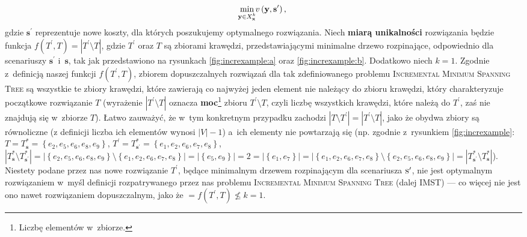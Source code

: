\begin{equation}
	\min_{\mathclap{\textbf{y} \in X^{k}_{\textbf{x}}}} v \left( \textbf{y}, \textbf{s}^{\prime} \right)\text{,}
\end{equation}\label{eq:imst}
gdzie $\textbf{s}^{\prime}$ reprezentuje nowe koszty, dla których poszukujemy optymalnego rozwiązania.
Niech \textbf{miarą unikalności} rozwiązania będzie funkcja $f \left( T^{\prime}, T \right) = \left| T^{\prime} \setminus T \right|$, gdzie $T^{\prime}$ oraz $T$ są zbiorami krawędzi, przedstawiającymi minimalne drzewo rozpinające, odpowiednio dla scenariuszy $\textbf{s}^{\prime}$ i~$\textbf{s}$, tak jak przedstawiono na rysunkach \ref{fig:increxample:a} oraz \ref{fig:increxample:b}.
Dodatkowo niech $k = 1$.
Zgodnie z~definicją naszej funkcji $f \left( T^{\prime}, T \right)$, zbiorem dopuszczalnych rozwiązań dla tak zdefiniowanego problemu \textsc{Incremental Minimum Spanning Tree} są wszystkie te zbiory krawędzi, które zawierają co najwyżej jeden element nie należący do zbioru krawędzi, który charakteryzuje początkowe rozwiązanie $T$ (wyrażenie $\left| T^{\prime} \setminus T \right|$ oznacza \textbf{moc}\footnote{
	Liczbę elementów w~zbiorze.
} zbioru $T^{\prime} \setminus T$, czyli liczbę wszystkich krawędzi, które należą do $T^{\prime}$, zaś nie znajdują się w~zbiorze $T$).
Łatwo zauważyć, że w~tym konkretnym przypadku zachodzi $\left| T \setminus T^{\prime} \right| = \left| T^{\prime} \setminus T \right|$, jako że obydwa zbiory są równoliczne (z definicji liczba ich elementów wynosi $\left| V \right| - 1$) a~ich elementy nie powtarzają się (np. zgodnie z~rysunkiem \ref{fig:increxample}: $T = T^{\ast}_{\textbf{s}} = \left\{ e_{2}, e_{5}, e_{6}, e_{8}, e_{9} \right\}$, $T^{\prime} = T^{\ast}_{\textbf{s}^{\prime}} = \left\{ e_{1}, e_{2}, e_{6}, e_{7}, e_{8} \right\}$, $\left| T^{\ast}_{\textbf{s}} \setminus T^{\ast}_{\textbf{s}^{\prime}} \right| = \left| \left\{ e_{2}, e_{5}, e_{6}, e_{8}, e_{9} \right\} \setminus \left\{ e_{1}, e_{2}, e_{6}, e_{7}, e_{8} \right\} \right| = \left| \left\{ e_{5}, e_{9} \right\} \right| = 2 = \left| \left\{ e_{1}, e_{7} \right\} \right| = \left| \left\{ e_{1}, e_{2}, e_{6}, e_{7}, e_{8} \right\} \setminus \left\{ e_{2}, e_{5}, e_{6}, e_{8}, e_{9} \right\} \right| = \left| T^{\ast}_{\textbf{s}^{\prime}} \setminus T^{\ast}_{\textbf{s}} \right|$).
Niestety podane przez nas nowe rozwiązanie $T^{\prime}$, będące minimalnym drzewem rozpinającym dla scenariusza $\textsc{s}^{\prime}$, nie jest optymalnym rozwiązaniem w~myśl definicji rozpatrywanego przez nas problemu \textsc{Incremental Minimum Spanning Tree} (dalej \textsc{IMST}) --- co więcej nie jest ono nawet rozwiązaniem dopuszczalnym, jako że $ = f \left( T^{\prime}, T \right) \nleqslant k = 1$.


